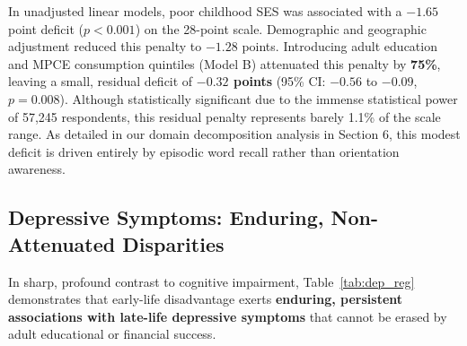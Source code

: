 \begin{table}[!htbp]
\centering
\small
\caption{\textbf{Continuous Memory and Orientation Score Regressions (Linear Survey OLS, $\hat{\beta}$ Point Differences, $\mathbf{N=57{,}245}$).}}
\label{tab:cog_cont}
\end{table}

In unadjusted linear models, poor childhood SES was associated with a $-1.65$ point deficit ($p < 0.001$) on the 28-point scale. Demographic and geographic adjustment reduced this penalty to $-1.28$ points. Introducing adult education and MPCE consumption quintiles (Model B) attenuated this penalty by \textbf{75\%}, leaving a small, residual deficit of \textbf{$-0.32$ points} (95\% CI: $-0.56$ to $-0.09$, $p = 0.008$). Although statistically significant due to the immense statistical power of 57,245 respondents, this residual penalty represents barely 1.1\% of the scale range. As detailed in our domain decomposition analysis in Section 6, this modest deficit is driven entirely by episodic word recall rather than orientation awareness.

\subsection{Depressive Symptoms: Enduring, Non-Attenuated Disparities}
In sharp, profound contrast to cognitive impairment, Table~\ref{tab:dep_reg} demonstrates that early-life disadvantage exerts \textbf{enduring, persistent associations with late-life depressive symptoms} that cannot be erased by adult educational or financial success.

